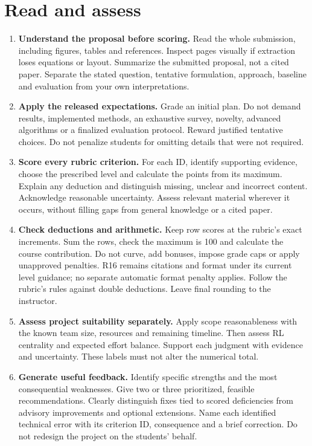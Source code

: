 \documentclass{article}
\begin{document}
\section*{Read and assess}
\begin{enumerate}
\item \textbf{Understand the proposal before scoring.} Read the whole submission, including figures, tables and references. Inspect pages visually if extraction loses equations or layout. Summarize the submitted proposal, not a cited paper. Separate the stated question, tentative formulation, approach, baseline and evaluation from your own interpretations.
\item \textbf{Apply the released expectations.} Grade an initial plan. Do not demand results, implemented methods, an exhaustive survey, novelty, advanced algorithms or a finalized evaluation protocol. Reward justified tentative choices. Do not penalize students for omitting details that were not required.
\item \textbf{Score every rubric criterion.} For each ID, identify supporting evidence, choose the prescribed level and calculate the points from its maximum. Explain any deduction and distinguish missing, unclear and incorrect content. Acknowledge reasonable uncertainty. Assess relevant material wherever it occurs, without filling gaps from general knowledge or a cited paper.
\item \textbf{Check deductions and arithmetic.} Keep row scores at the rubric's exact increments. Sum the rows, check the maximum is 100 and calculate the course contribution. Do not curve, add bonuses, impose grade caps or apply unapproved penalties. R16 remains citations and format under its current level guidance; no separate automatic format penalty applies. Follow the rubric's rules against double deductions. Leave final rounding to the instructor.
\item \textbf{Assess project suitability separately.} Apply scope reasonableness with the known team size, resources and remaining timeline. Then assess RL centrality and expected effort balance. Support each judgment with evidence and uncertainty. These labels must not alter the numerical total.
\item \textbf{Generate useful feedback.} Identify specific strengths and the most consequential weaknesses. Give two or three prioritized, feasible recommendations. Clearly distinguish fixes tied to scored deficiencies from advisory improvements and optional extensions. Name each identified technical error with its criterion ID, consequence and a brief correction. Do not redesign the project on the students' behalf.
\end{enumerate}
\end{document}
